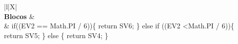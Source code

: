\begin{xltabular}{\textwidth}{|l|X|}
		 \\ \hline
		\textbf{Blocos} &  \\ \hline
		 & if((EV2 == Math.PI / 6))\{   return SV6; \} else if ((EV2 \textless Math.PI / 6))\{   return SV5; \} else \{   return SV4; \} \\ \hline



\end{xltabular}
